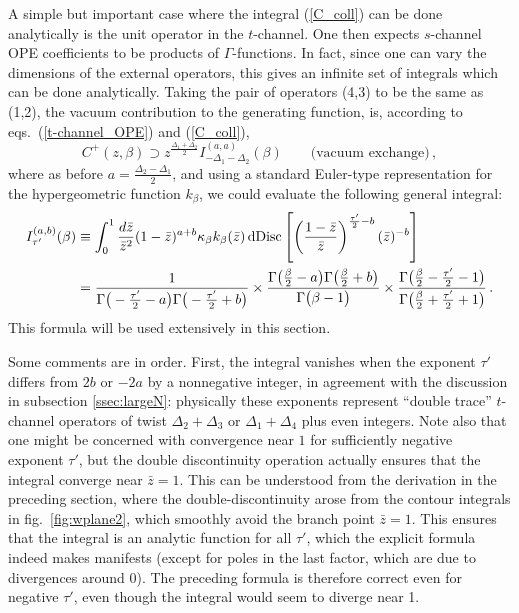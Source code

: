 \documentclass[11pt, reqno,preprint]{article}
\def\be{\begin{equation}}
\def\ee{\end{equation}}
\def\dDisc{{\rm dDisc}\,}
\def\zbar{\bar{z}}
\begin{document}
A simple but important case where the integral (\ref{C_coll}) can be done analytically is the unit operator in the $t$-channel.
One then expects $s$-channel OPE coefficients to be products of $\Gamma$-functions.
In fact, since one can vary the dimensions of the external operators, this gives an infinite set of integrals which can be done analytically.
Taking the pair of operators (4,3) to be the same as (1,2), the vacuum contribution to the generating function,
is, according to eqs.~(\ref{t-channel_OPE}) and (\ref{C_coll}),
\be
 C^+(z,\beta)\supset z^{\frac{\Delta_1+\Delta_2}{2}} I_{-\Delta_1-\Delta_2}^{(a,a)}(\beta) \qquad \mbox{(vacuum exchange)}\,,
 \label{unit_contribution}
\ee
where as before $a=\frac{\Delta_2-\Delta_1}{2}$,
and using a standard Euler-type representation for the hypergeometric function $k_\beta$, we could evaluate the following general
integral:
\be\label{Ibeta}\begin{aligned}
I_{\tau'}^{(a,b)}(\beta)
&\equiv \int_0^1 \frac{d\zbar}{\zbar^2} (1-\zbar)^{a+b}\kappa_\beta k_\beta(\zbar)\, \dDisc\!\left[
\left(\frac{1-\zbar}{\zbar}\right)^{\frac{\tau'}{2}-b} (\zbar)^{-b}\right]
\\ &= \frac{1}{\Gamma\big(-\tfrac{\tau'}{2}-a\big)\Gamma\big(-\tfrac{\tau'}{2}+b\big)}\times
\frac{\Gamma\big(\tfrac{\beta}{2}-a\big)\Gamma\big(\tfrac{\beta}{2}+b\big)}{\Gamma\big(\beta-1\big)}
\times \frac{\Gamma\big(\tfrac{\beta}{2}-\tfrac{\tau'}{2}-1\big)}{\Gamma\big(\tfrac{\beta}{2}+\tfrac{\tau'}{2}+1\big)}\,.
\end{aligned}\ee
This formula will be used extensively in this section.

Some comments are in order.
First, the integral vanishes when the exponent $\tau'$ differs from $2b$ or $-2a$ by a nonnegative integer,
in agreement with the discussion in subsection \ref{ssec:largeN}: physically these exponents
represent ``double trace'' $t$-channel operators of twist $\Delta_2+\Delta_3$ or $\Delta_1+\Delta_4$ plus even integers.
Note also that one might be concerned with convergence near $1$ for sufficiently negative exponent $\tau'$, but the double discontinuity operation actually ensures that the integral converge near $\zbar=1$.
This can be understood from the derivation in the preceding section, where the double-discontinuity arose from the contour integrals in fig.~\ref{fig:wplane2}, which smoothly avoid the branch point $\zbar=1$.
This ensures that the integral is an analytic function for all $\tau'$, which the
explicit formula indeed makes manifests (except for poles in the last factor, which are due to divergences around 0).
The preceding formula is therefore correct even for negative $\tau'$, even though the integral would seem to diverge near 1.
\end{document}
